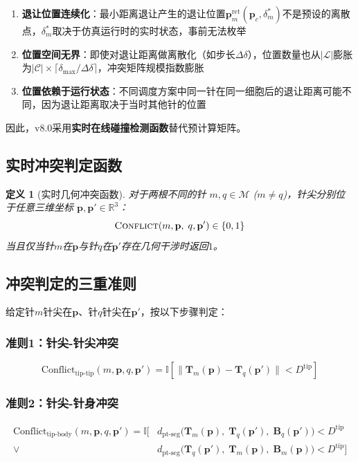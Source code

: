 \documentclass[11pt,a4paper]{article}
\newtheorem{definition}{定义}[section]
\begin{document}
\begin{enumerate}
    \item \textbf{退让位置连续化}：最小距离退让产生的退让位置$\mathbf{p}_m^{\text{ret}}(\mathbf{p}_c, \delta_m^*)$不是预设的离散点，$\delta_m^*$取决于仿真运行时的实时状态，事前无法枚举
    \item \textbf{位置空间无界}：即使对退让距离做离散化（如步长$\Delta\delta$），位置数量也从$|\mathcal{L}|$膨胀为$|\mathcal{C}| \times \lceil \delta_{\max}/\Delta\delta \rceil$，冲突矩阵规模指数膨胀
    \item \textbf{位置依赖于运行状态}：不同调度方案中同一针在同一细胞后的退让距离可能不同，因为退让距离取决于当时其他针的位置
\end{enumerate}

因此，v8.0采用\textbf{实时在线碰撞检测函数}替代预计算矩阵。

\subsection{实时冲突判定函数}

\begin{definition}[实时几何冲突函数]
对于两根不同的针 $m, q \in \mathcal{M}$ ($m \neq q$)，针尖分别位于任意三维坐标 $\mathbf{p}, \mathbf{p}' \in \mathbb{R}^3$：
\begin{equation}
    \textsc{Conflict}(m, \mathbf{p}, \; q, \mathbf{p}') \in \{0, 1\}
\end{equation}
当且仅当针$m$在$\mathbf{p}$与针$q$在$\mathbf{p}'$存在几何干涉时返回$1$。
\end{definition}

\subsection{冲突判定的三重准则}

给定针$m$针尖在$\mathbf{p}$、针$q$针尖在$\mathbf{p}'$，按以下步骤判定：

\subsubsection{准则1：针尖-针尖冲突}
\begin{equation}
    \text{Conflict}_{\text{tip-tip}}(m,\mathbf{p},q,\mathbf{p}') = \mathbb{I}\left[ \|\mathbf{T}_m(\mathbf{p}) - \mathbf{T}_q(\mathbf{p}')\| < D^{\text{tip}} \right]
\end{equation}

\subsubsection{准则2：针尖-针身冲突}
\begin{align}
    \text{Conflict}_{\text{tip-body}}(m,\mathbf{p},q,\mathbf{p}') = \mathbb{I}\Big[ &d_{\text{pt-seg}}\big(\mathbf{T}_m(\mathbf{p}),\; \mathbf{T}_q(\mathbf{p}'),\; \mathbf{B}_q(\mathbf{p}')\big) < D^{\text{tip}} \nonumber \\
    \lor \; &d_{\text{pt-seg}}\big(\mathbf{T}_q(\mathbf{p}'),\; \mathbf{T}_m(\mathbf{p}),\; \mathbf{B}_m(\mathbf{p})\big) < D^{\text{tip}} \Big]
\end{align}
\end{document}
